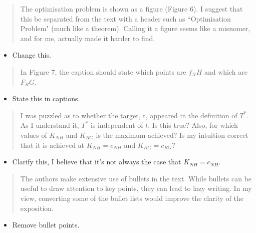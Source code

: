 \documentclass{article}
\begin{document}
\begin{quote}
    \begin{textit}
        {
        The optimisation problem is shown as a figure (Figure 6). I suggest
        that this be separated from the text with a header such as
        ``Optimisation Problem" (much like a theorem).  Calling it a figure
        seems like a misnomer, and for me, actually made it harder to find.
        }
    \end{textit}
\end{quote}

\begin{itemize}
    \item Change this.
\end{itemize}

\begin{quote}
    \begin{textit}
        {
        In Figure 7, the caption should state which points are \(f_NH\) and
        which are \(F_RG\).
        }
    \end{textit}
\end{quote}

\begin{itemize}
    \item State this in captions.
\end{itemize}

\begin{quote}
    \begin{textit}
        {
I was puzzled as to whether the target, t, appeared in the definition
of \(T^*\). As I understand it, \(T^*\) is independent of \(t\). Is this true?
Also, for which values of \(K_{NH}\) and \(K_{RG}\) is the maximum achieved? Is my
intuition correct that it is achieved at \(K_{NH} = c_{NH}\) and \(K_{RG} = c_{RG}\)?
        }
    \end{textit}
\end{quote}

\begin{itemize}
    \item Clarify this, I believe that it's not always the case that \(K_{NH}=c_{NH}\).
\end{itemize}

\begin{quote}
    \begin{textit}
        {
The authors make extensive use of bullets in the text. While bullets
can be useful to draw attention to key points, they can lead to lazy
writing. In my view, converting some of the bullet lists would improve
the clarity of the exposition.
        }
    \end{textit}
\end{quote}

\begin{itemize}
    \item Remove bullet points.
\end{itemize}
\end{document}
